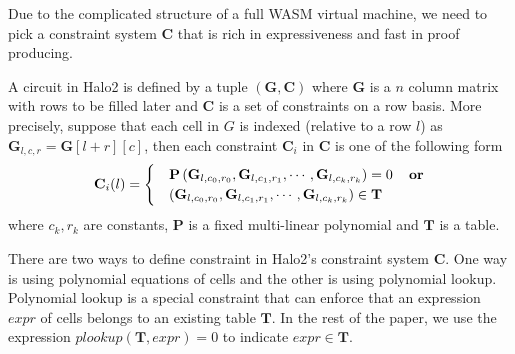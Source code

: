 Due to the complicated structure of a full WASM virtual machine, we need to
pick a constraint system $\mathbf{C}$ that is rich in expressiveness and fast in proof producing. 

A circuit in Halo2 is defined by a tuple $(\mathbf{G}, \mathbf{C})$ where $\mathbf{G}$ is a $n$ column matrix with rows to be filled later and $\mathbf{C}$ is a set of constraints on a row basis. More precisely, suppose that each cell in $G$ is indexed (relative to a row $l$) as $\mathbf{G}_{l, c, r} = \mathbf{G}[l+r][c]$, then each constraint $\mathbf{C}_i$ in $\mathbf{C}$ is one of the following form 
\begin{equation}
    \mathbf{C}_i(l) = \begin{cases}
        &\mathbf{P} \left(\mathbf{G}_{l, c_0, r_0}, \mathbf{G}_{l, c_1, r_1}, \cdots, \mathbf{G}_{l, c_k, r_k}\right) = 0 \,\,\,\,\,\,\, \textrm{\textbf{or}} \\
        &\left(\mathbf{G}_{l, c_0, r_0}, \mathbf{G}_{l, c_1, r_1}, \cdots, \mathbf{G}_{l, c_k, r_k}\right) \in \mathbf{T}
    \end{cases}
    \label{eq:cs-def}
\end{equation} where $c_k, r_k$ are constants, $\mathbf{P}$ is a fixed multi-linear polynomial and $\mathbf{T}$ is a table. 

\begin{remark}
There are two ways to define constraint in Halo2's constraint system $\mathbf{C}$. One way is using polynomial equations of cells and the other is using polynomial lookup. Polynomial lookup is a special constraint that can enforce that an expression $expr$ of cells belongs to an existing table $\mathbf{T}$. In the rest of the paper, we use the expression $plookup(\mathbf{T}, expr) = 0$ to indicate $expr \in \mathbf{T}$. 
\end{remark}

